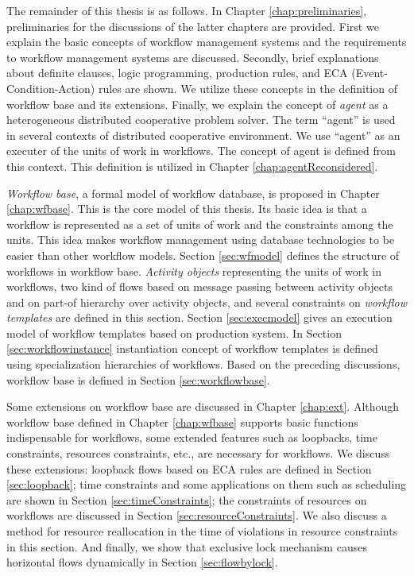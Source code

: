 The remainder of this thesis is as follows.  In Chapter
\ref{chap:preliminaries}, preliminaries for the discussions of the
latter chapters are provided.  First we explain the basic concepts of
workflow management systems and the requirements to workflow management
systems are discussed.  Secondly, brief explanations about definite
clauses, logic programming, production rules, and ECA
(Event-Condition-Action) rules are shown.  We utilize these concepts in
the definition of workflow base and its extensions.  Finally, we explain
the concept of {\em agent} as a heterogeneous distributed cooperative
problem solver.  The term ``agent'' is used in several contexts of
distributed cooperative environment.  We use ``agent'' as an executer of 
the units of work in workflows.  The concept of agent is defined from
this context.  This definition is utilized in Chapter
\ref{chap:agentReconsidered}.

\emph{Workflow base}, a formal model of workflow database, is proposed
in Chapter \ref{chap:wfbase}.  This is the core model of this thesis.
Its basic idea is that a workflow is represented as a set of units of
work and the constraints among the units.  This idea makes workflow
management using database technologies to be easier than other workflow
models.  Section \ref{sec:wfmodel} defines the structure of workflows in
workflow base.  {\em Activity objects} representing the units of work in
workflows, two kind of flows based on message passing between activity
objects and on part-of hierarchy over activity objects, and several
constraints on {\em workflow templates} are defined in this section.
Section \ref{sec:execmodel} gives an execution model of workflow
templates based on production system.  In Section
\ref{sec:workflowinstance} instantiation concept of workflow templates
is defined using specialization hierarchies of workflows.  Based on the
preceding discussions, workflow base is defined in Section
\ref{sec:workflowbase}.

Some extensions on workflow base are discussed in Chapter
\ref{chap:ext}.  Although workflow base defined in Chapter
\ref{chap:wfbase} supports basic functions indispensable for workflows,
some extended features such as loopbacks, time constraints, resources
constraints, etc., are necessary for workflows.  We discuss these
extensions: loopback flows based on ECA rules are defined in Section
\ref{sec:loopback}; time constraints and some applications on them such
as scheduling are shown in Section \ref{sec:timeConstraints}; the
constraints of resources on workflows are discussed in Section
\ref{sec:resourceConstraints}.  We also discuss a method for resource
reallocation in the time of violations in resource constraints in this
section.  And finally, we show that exclusive lock mechanism causes
horizontal flows dynamically in Section \ref{sec:flowbylock}.


